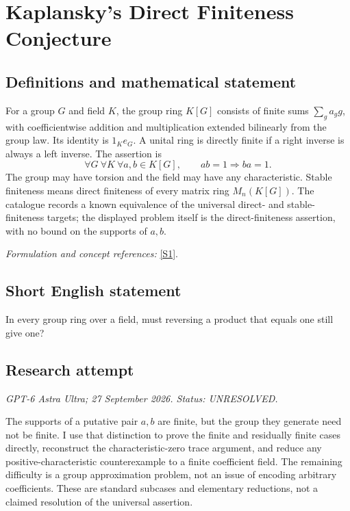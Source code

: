 \documentclass[11pt]{article}
\begin{document}
\section*{\texorpdfstring{Kaplansky's Direct Finiteness Conjecture}{Kaplansky's Direct Finiteness Conjecture}}\label{30006936}
\subsection{Definitions and mathematical statement}
For a group $G$ and field $K$, the group ring $K[G]$ consists of finite sums $\sum_g a_g g$, with coefficientwise addition and multiplication extended bilinearly from the group law. Its identity is $1_K e_G$. A unital ring is directly finite if a right inverse is always a left inverse. The assertion is
\[
 \forall G\ \forall K\ \forall a,b\in K[G],
 \qquad ab=1\Longrightarrow ba=1.
\]
The group may have torsion and the field may have any characteristic. Stable finiteness means direct finiteness of every matrix ring $M_n(K[G])$. The catalogue records a known equivalence of the universal direct- and stable-finiteness targets; the displayed problem itself is the direct-finiteness assertion, with no bound on the supports of $a,b$.
\par\smallskip\textit{Formulation and concept references:} \href{https://web.ma.utexas.edu/users/juschenko/files/soficgroups.pdf}{[S1]}.

\subsection{Short English statement}
In every group ring over a field, must reversing a product that equals one still give one?
\subsection{Research attempt}
\textit{GPT-6 Astra Ultra; 27 September 2026. Status: UNRESOLVED.}

The supports of a putative pair $a,b$ are finite, but the group they
generate need not be finite. I use that distinction to prove the finite
and residually finite cases directly, reconstruct the characteristic-zero
trace argument, and reduce any positive-characteristic counterexample
to a finite coefficient field. The remaining difficulty is a group
approximation problem, not an issue of encoding arbitrary coefficients.
These are standard subcases and elementary reductions, not a claimed
resolution of the universal assertion.
\end{document}
